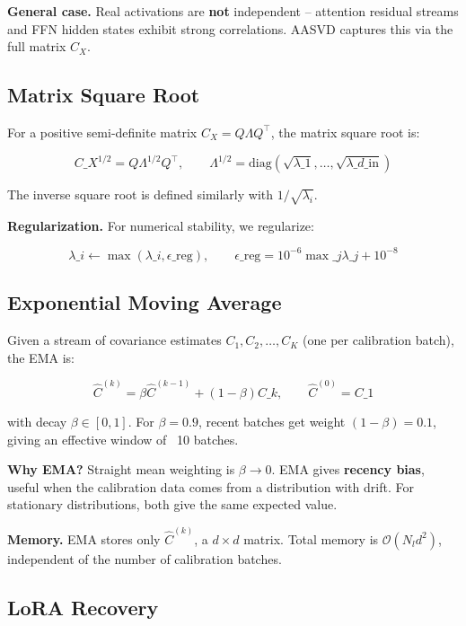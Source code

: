 \textbf{General case.} Real activations are \textbf{not} independent -- attention 
residual streams and FFN hidden states exhibit strong correlations. AASVD 
captures this via the full matrix $C_X$.

\subsection{Matrix Square Root}

For a positive semi-definite matrix $C_X = Q \Lambda Q^\top$, the matrix 
square root is:

\[
C\_X^{1/2} = Q \Lambda^{1/2} Q^\top, \qquad
\Lambda^{1/2} = \mathrm{diag}(\sqrt{\lambda\_1}, \dots, \sqrt{\lambda\_{d\_\text{in}}})
\tag{3.6}
\]

The inverse square root is defined similarly with $1/\sqrt{\lambda_i}$.

\textbf{Regularization.} For numerical stability, we regularize:

\[
\lambda\_i \leftarrow \max(\lambda\_i, \epsilon\_\text{reg}), \qquad
\epsilon\_\text{reg} = 10^{-6} \max\_j \lambda\_j + 10^{-8}
\tag{3.7}
\]

\subsection{Exponential Moving Average}

Given a stream of covariance estimates $C_1, C_2, \dots, C_K$ (one per 
calibration batch), the EMA is:

\[
\hat{C}^{(k)} = \beta \hat{C}^{(k-1)} + (1 - \beta) C\_k, \qquad
\hat{C}^{(0)} = C\_1
\tag{3.8}
\]

with decay $\beta \in [0, 1]$. For $\beta = 0.9$, recent batches get weight 
$(1 - \beta) = 0.1$, giving an effective window of ~10 batches.

\textbf{Why EMA?} Straight mean weighting is $\beta \to 0$. EMA gives 
\textbf{recency bias}, useful when the calibration data comes from a distribution 
with drift. For stationary distributions, both give the same expected value.

\textbf{Memory.} EMA stores only $\hat{C}^{(k)}$, a $d \times d$ matrix. Total 
memory is $\mathcal{O}(N_l d^2)$, independent of the number of calibration 
batches.

\subsection{LoRA Recovery}

